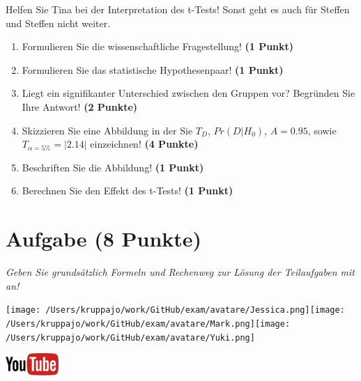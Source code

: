 \documentclass[a4paper, 9pt]{scrartcl}\usepackage[]{graphicx}\usepackage[]{xcolor}
\begin{document}
Helfen Sie Tina bei der Interpretation des t-Tests! Sonst geht es auch für Steffen und Steffen nicht weiter.
  
\begin{enumerate}
  \item Formulieren Sie die wissenschaftliche Fragestellung! \textbf{(1 Punkt)}
  \item Formulieren Sie das statistische Hypothesenpaar! \textbf{(1 Punkt)}
\item Liegt ein signifikanter Unterschied zwischen den Gruppen vor? Begründen Sie Ihre Antwort! \textbf{(2 Punkte)}
\item Skizzieren Sie eine Abbildung in der Sie $T_{D}$, $Pr(D|H_0)$, $A=0.95$, sowie $T_{\alpha=5\%} = |2.14|$ einzeichnen! \textbf{(4 Punkte)}
\item Beschriften Sie die Abbildung! \textbf{(1 Punkt)}  
\item Berechnen Sie den Effekt des t-Tests! \textbf{(1 Punkt)}
\end{enumerate} 
\clearpage

\section{Aufgabe \hfill (8 Punkte)}

\textit{Geben Sie grundsätzlich Formeln und Rechenweg zur Lösung der Teilaufgaben mit an!} \\[1Ex]
 

 
\begin{minipage}[t]{0.5\textwidth}
\texttt{[image: /Users/kruppajo/work/GitHub/exam/avatare/Jessica.png]}\hspace{-4mm}\texttt{[image: /Users/kruppajo/work/GitHub/exam/avatare/Mark.png]}\hspace{-4mm}\texttt{[image: /Users/kruppajo/work/GitHub/exam/avatare/Yuki.png]}
\end{minipage}
\begin{minipage}[t]{0.5\textwidth}
\hfill
\href{https://youtu.be/wJqsNV1hOW8}{\includegraphics[width = 2cm]{img/youtube}}
\end{minipage}
\vspace{1ex}
\end{document}
